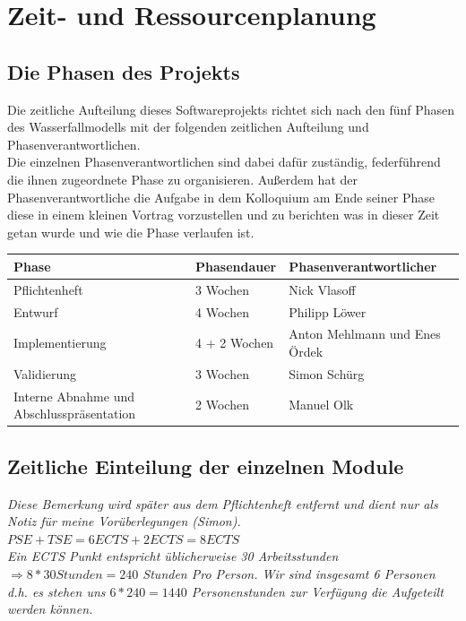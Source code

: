\documentclass[10pt,a4paper]{article}
\begin{document}
\section{Zeit- und Ressourcenplanung}

\subsection{Die Phasen des Projekts}
Die zeitliche Aufteilung dieses Softwareprojekts richtet sich nach den fünf Phasen des Wasserfallmodells mit der folgenden zeitlichen Aufteilung und Phasenverantwortlichen.\\
Die einzelnen Phasenverantwortlichen sind dabei dafür zuständig, federführend die ihnen zugeordnete Phase zu organisieren. Außerdem hat der Phasenverantwortliche die Aufgabe in dem Kolloquium am Ende seiner Phase diese in einem kleinen Vortrag vorzustellen und zu berichten was in dieser Zeit getan wurde und wie die Phase verlaufen ist.\\

\begin{tabular}[h]{lll}
	\hline
	\textbf{Phase} & \textbf{Phasendauer} & \textbf{Phasenverantwortlicher} \\
	\hline
	Pflichtenheft & 3 Wochen & Nick Vlasoff \\
	Entwurf & 4 Wochen & Philipp Löwer \\
	Implementierung & 4 + 2 Wochen & Anton Mehlmann und Enes Ördek \\
	Validierung & 3 Wochen & Simon Schürg \\
	Interne Abnahme und Abschlusspräsentation & 2 Wochen & Manuel Olk \\
	\hline
\end{tabular}

\subsection{Zeitliche Einteilung der einzelnen Module}
\textit{Diese Bemerkung wird später aus dem Pflichtenheft entfernt und dient nur als Notiz für meine Vorüberlegungen (Simon).\\ $PSE + TSE = 6 ECTS + 2 ECTS = 8 ECTS$\\
Ein ECTS Punkt entspricht üblicherweise 30 Arbeitsstunden $\Rightarrow 8 * 30 Stunden = 240$ Stunden Pro Person. Wir sind insgesamt 6 Personen d.h. es stehen uns $6 * 240 = 1440$ Personenstunden zur Verfügung die Aufgeteilt werden können. }
\end{document}
